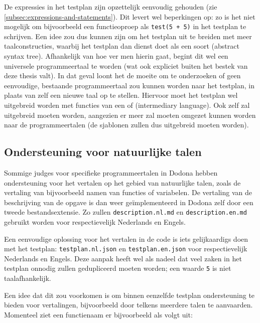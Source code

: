 De expressies in het testplan zijn opzettelijk eenvoudig gehouden (zie \cref{subsec:expressions-and-statements}).
Dit levert wel beperkingen op: zo is het niet mogelijk om bijvoorbeeld een functieoproep als \texttt{test(5 + 5)} in het testplan te schrijven.
Een idee zou dus kunnen zijn om het testplan uit te breiden met meer taalconstructies, waarbij het testplan dan dienst doet als een soort  (abstract syntax tree).
Afhankelijk van hoe ver men hierin gaat, begint dit wel een universele programmeertaal te worden (wat ook expliciet buiten het bestek van deze thesis valt).
In dat geval loont het de moeite om te onderzoeken of geen eenvoudige, bestaande programmeertaal  zou kunnen worden naar het testplan, in plaats van zelf een nieuwe taal op te stellen.
Hiervoor moet het testplan wel uitgebreid worden met functies van een  of  (intermediary language).
Ook \tested{} zelf zal uitgebreid moeten worden, aangezien er meer zal moeten omgezet kunnen worden naar de programmeertalen (de sjablonen zullen dus uitgebreid moeten worden).

\subsection{Ondersteuning voor natuurlijke talen}\label{subsec:ondersteuning-voor-natuurlijke-talen}

Sommige judges voor specifieke programmeertalen in Dodona hebben ondersteuning voor het vertalen op het gebied van natuurlijke talen, zoals de vertaling van bijvoorbeeld namen van functies of variabelen.
De vertaling van de beschrijving van de opgave is dan weer geïmplementeerd in Dodona zelf door een tweede bestandsextensie.
Zo zullen \texttt{description.nl.md} en \texttt{description.en.md} gebruikt worden voor respectievelijk Nederlands en Engels.

Een eenvoudige oplossing voor het vertalen in de code is iets gelijkaardigs doen met het testplan: \texttt{testplan.nl.json} en \texttt{testplan.en.json} voor respectievelijk Nederlands en Engels.
Deze aanpak heeft wel als nadeel dat veel zaken in het testplan onnodig zullen gedupliceerd moeten worden;
een waarde \texttt{5} is niet taalafhankelijk.

Een idee dat dit zou voorkomen is om binnen eenzelfde testplan ondersteuning te bieden voor vertalingen, bijvoorbeeld door telkens meerdere talen te aanvaarden.
Momenteel ziet een functienaam er bijvoorbeeld als volgt uit:


